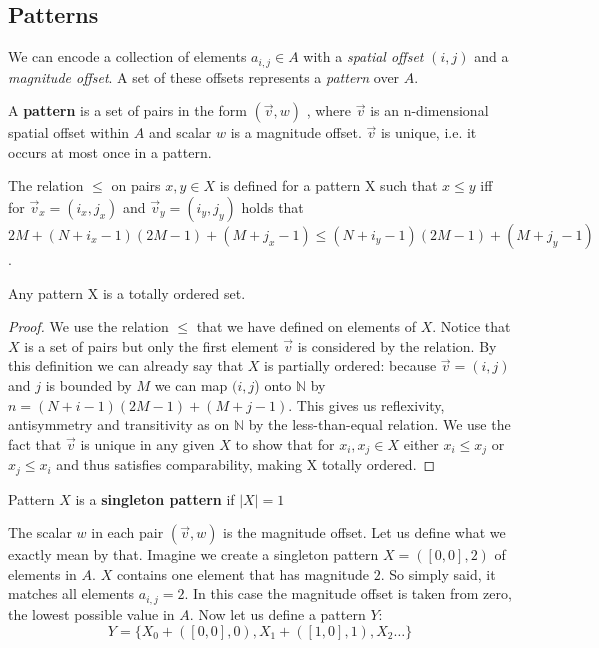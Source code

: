 \documentclass{llncs}
\begin{document}
\subsection{Patterns}
We can encode a collection of elements $a_{i,j}\in A$ with a \emph{spatial offset} $(i,j)$ and a \emph{magnitude offset}. A set of these offsets represents a \emph{pattern} over $A$. 
\begin{definition}A \textbf{pattern} is a set of pairs in the form $(\vec{v},w)$ , where $\vec{v}$ is an n-dimensional spatial offset within $A$ and scalar $w$ is a magnitude offset. $\vec{v}$ is unique, i.e. it occurs at most once in a pattern.
\end{definition} 
\begin{definition}\label{leq}
The relation $\leq$ on pairs $x, y\in X$ is defined for a pattern X such that $x\leq y$ iff for $\vec{v}_x=(i_x,j_x)$ and $\vec{v}_y=(i_y,j_y)$ holds that $2M+(N+i_x-1)(2M-1)+(M+j_x-1) \leq (N+i_y-1)(2M-1)+(M+j_y-1)$.
\end{definition}
\begin{theorem} Any pattern X is a totally ordered set.
\end{theorem}
\begin{proof}
We use the relation $\leq$ that we have defined on elements of $X$. Notice that $X$ is a set of pairs but only the first element $\vec{v}$ is considered by the relation. By this definition we can already say that $X$ is partially ordered: because $\vec{v}=(i,j)$ and $j$ is bounded by $M$ we can map $(i,j$) onto $\mathbb{N}$ by $n = (N+i-1)(2M-1)+(M+j-1)$. This gives us reflexivity, antisymmetry and transitivity as on $\mathbb{N}$ by the less-than-equal relation. We use the fact that $\vec{v}$ is unique in any given $X$ to show that for $x_i,x_j\in X$ either $x_i\leq x_j$ or $x_j\leq x_i$ and thus satisfies comparability, making X totally ordered.  
\end{proof}
\begin{definition}Pattern $X$ is a \textbf{singleton pattern} if $|X|=1$
\end{definition}
The scalar $w$ in each pair $(\vec{v},w)$ is the magnitude offset. Let us define what we exactly mean by that. Imagine we create a singleton pattern $X=([0,0],2)$ of elements in $A$. $X$ contains one element that has magnitude $2$. So simply said, it matches all elements $a_{i,j}=2$. In this case the magnitude offset is taken from zero, the lowest possible value in $A$. Now let us define a pattern $Y$:
$$Y=\big\{X_0+([0,0],0), X_1+([1,0],1),X_2\dots\big\}$$
\end{document}
